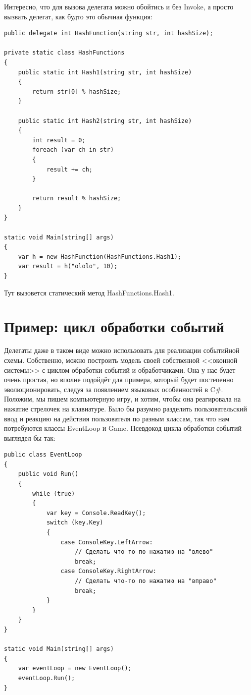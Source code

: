 \documentclass[a5paper]{article}
\begin{document}
Интересно, что для вызова делегата можно обойтись и без Invoke, а просто вызвать делегат, как будто это обычная функция:

\begin{verbatim}
public delegate int HashFunction(string str, int hashSize);

private static class HashFunctions
{
    public static int Hash1(string str, int hashSize)
    {
        return str[0] % hashSize;
    }

    public static int Hash2(string str, int hashSize)
    {
        int result = 0;
        foreach (var ch in str)
        {
            result += ch;
        }

        return result % hashSize;
    }
}

static void Main(string[] args)
{
    var h = new HashFunction(HashFunctions.Hash1);
    var result = h("ololo", 10);
}
\end{verbatim}

Тут вызовется статический метод HashFunctions.Hash1.

\section{Пример: цикл обработки событий}

Делегаты даже в таком виде можно использовать для реализации событийной схемы. Собственно, можно построить модель своей собственной <<оконной системы>> с циклом обработки событий и обработчиками. Она у нас будет очень простая, но вполне подойдёт для примера, который будет постепенно эволюционировать, следуя за появлением языковых особенностей в C\#. Положим, мы пишем компьютерную игру, и хотим, чтобы она реагировала на нажатие стрелочек на клавиатуре. Было бы разумно разделить пользовательский ввод и реакцию на действия пользователя по разным классам, так что нам потребуются классы EventLoop и Game. Псевдокод цикла обработки событий выглядел бы так:

\begin{verbatim}
public class EventLoop
{
    public void Run()
    {
        while (true)
        {
            var key = Console.ReadKey();
            switch (key.Key)
            {
                case ConsoleKey.LeftArrow:
                    // Сделать что-то по нажатию на "влево"
                    break;
                case ConsoleKey.RightArrow:
                    // Сделать что-то по нажатию на "вправо"
                    break;
            }
        }
    }
}

static void Main(string[] args)
{
    var eventLoop = new EventLoop();
    eventLoop.Run();
}
\end{verbatim}
\end{document}
